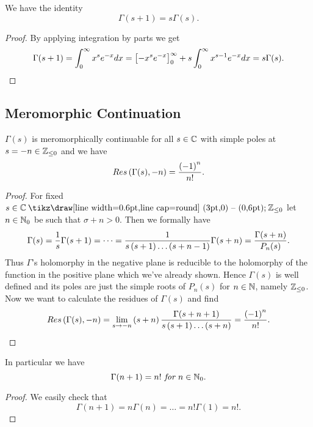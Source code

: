 \begin{theorem}
	We have the identity
\begin{equation*}
	\Gamma(s + 1) = s \Gamma(s).
\end{equation*}
\end{theorem}
\begin{proof}
	By applying integration by parts we get
\begin{equation*}
	\Gamma(s + 1) = \int _0 ^\infty x^{s} e^{-x} dx =\left[-x^s e^{-x}\right] _0 ^\infty + s \int _0 ^\infty x^{s - 1} e^{-x} dx = s\Gamma(s).
\end{equation*}
\end{proof}


\subsection{Meromorphic Continuation}


\begin{theorem}
	$\Gamma(s)$ is meromorphically continuable for all $s \in \mathbb{C}$ with simple poles at $s = -n\in \mathbb{Z} _{\leq 0}$ and we have
\begin{equation*}
	Res\left(\Gamma(s), -n\right) = \frac{\left(-1\right)^n}{n!}.
\end{equation*}
\end{theorem}
\begin{proof}
	For fixed $s \in \field{C} \mysetminus \field{Z}_{\leq 0}$ let $n \in \mathbb{N}_0$ be such that $\sigma + n > 0$. Then we formally have
\begin{equation*}
	\Gamma(s) = \frac{1}{s} \Gamma(s + 1) = \dots = \frac{1}{s \left(s + 1\right) \dots \left(s + n - 1\right)} \Gamma(s + n) = \frac{\Gamma(s + n)}{P_n(s)}.
\end{equation*}
	Thus $\Gamma$'s holomorphy in the negative plane is reducible to the holomorphy of the function in the positive plane which we've already shown. Hence $\Gamma(s)$ is well defined and its poles are just the simple roots of $P_n(s)$ for $n \in \mathbb{N}$, namely $\mathbb{Z}_{\leq 0}$. \\
	Now we want to calculate the residues of $\Gamma(s)$ and find
\begin{equation*}
	Res\left(\Gamma(s), -n\right) = \lim\limits_{s \to -n} \left(s + n\right) \frac{\Gamma(s + n + 1)}{s \left(s + 1\right) \dots \left(s + n\right)} = \frac{\left(-1\right)^n}{n!}.
\end{equation*}
\end{proof}


\begin{lemma}
	In particular we have
\begin{equation*}
	\Gamma(n + 1) = n! \textit{ for } n \in \mathbb{N}_0.
\end{equation*}
\end{lemma}
\begin{proof}
	We easily check that
\begin{equation*}
	\Gamma(n + 1) = n \Gamma(n) = \dots = n! \Gamma(1) = n!.
\end{equation*}
\end{proof}


